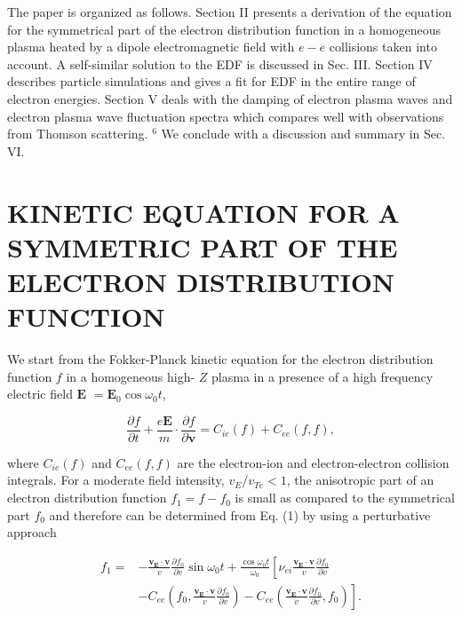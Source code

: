\documentclass[oneside,onecolumn]{article}
\begin{document}
\begin{sloppypar}
 The paper is organized as follows. Section II presents a derivation of the equation for the symmetrical part of the electron distribution function in a homogeneous plasma heated by a dipole electromagnetic field with $e-e$ collisions taken into account. A self-similar solution to the EDF is discussed in Sec. III. Section IV describes particle simulations and gives a fit for EDF in the entire range of electron energies. Section $\mathrm{V}$ deals with the damping of electron plasma waves and electron plasma wave fluctuation spectra which compares well with observations from Thomson scattering. ${ }^{6}$ We conclude with a discussion and summary in Sec. VI.
 
 \section{KINETIC EQUATION FOR A SYMMETRIC PART OF THE ELECTRON DISTRIBUTION FUNCTION}
 We start from the Fokker-Planck kinetic equation for the electron distribution function $f$ in a homogeneous high- $Z$ plasma in a presence of a high frequency electric field $\mathbf{E}$ $=\mathbf{E}_{0} \cos \omega_{0} t$,
 
 \begin{dmath}[compact]
 \frac{\partial f}{\partial t}+\frac{e \mathbf{E}}{m} \cdot \frac{\partial f}{\partial \mathbf{v}}=C_{i e}(f)+C_{e e}(f, f),
 \end{dmath}
 
 where $C_{i e}(f)$ and $C_{e e}(f, f)$ are the electron-ion and electron-electron collision integrals. For a moderate field intensity, $v_{E} / v_{T e}<1$, the anisotropic part of an electron distribution function $f_{1}=f-f_{0}$ is small as compared to the symmetrical part $f_{0}$ and therefore can be determined from Eq. (1) by using a perturbative approach
 
 \begin{dmath}[compact]
 \begin{aligned}
 f_{1}= & -\frac{\mathbf{v}_{\mathbf{E}} \cdot \mathbf{v}}{v} \frac{\partial f_{0}}{\partial v} \sin \omega_{0} t+\frac{\cos \omega_{0} t}{\omega_{0}}\left[\nu_{e i} \frac{\mathbf{v}_{\mathbf{E}} \cdot \mathbf{v}}{v} \frac{\partial f_{0}}{\partial v}\right. \\
 & \left.-C_{e e}\left(f_{0}, \frac{\mathbf{v}_{\mathbf{E}} \cdot \mathbf{v}}{v} \frac{\partial f_{0}}{\partial v}\right)-C_{e e}\left(\frac{\mathbf{v}_{\mathbf{E}} \cdot \mathbf{v}}{v} \frac{\partial f_{0}}{\partial v}, f_{0}\right)\right] .
 \end{aligned}
 \end{dmath}
 

\end{sloppypar}
\end{document}
